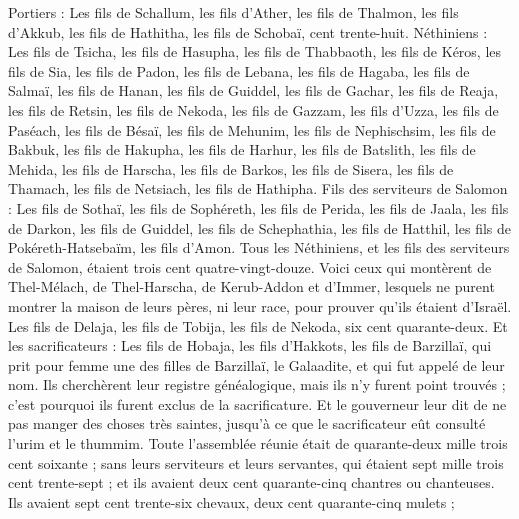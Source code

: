 \begin{multicols}{2}
Portiers : Les fils de Schallum, les fils d'Ather, les fils de Thalmon, les fils d'Akkub, les fils de Hathitha, les fils de Schobaï, cent trente-huit.
Néthiniens : Les fils de Tsicha, les fils de Hasupha, les fils de Thabbaoth,
les fils de Kéros, les fils de Sia, les fils de Padon,
les fils de Lebana, les fils de Hagaba, les fils de Salmaï,
les fils de Hanan, les fils de Guiddel, les fils de Gachar,
les fils de Reaja, les fils de Retsin, les fils de Nekoda,
les fils de Gazzam, les fils d’Uzza, les fils de Paséach,
les fils de Bésaï, les fils de Mehunim, les fils de Nephischsim,
les fils de Bakbuk, les fils de Hakupha, les fils de Harhur,
les fils de Batslith, les fils de Mehida, les fils de Harscha,
les fils de Barkos, les fils de Sisera, les fils de Thamach,
les fils de Netsiach, les fils de Hathipha.
Fils des serviteurs de Salomon : Les fils de Sothaï, les fils de Sophéreth, les fils de Perida,
les fils de Jaala, les fils de Darkon, les fils de Guiddel,
les fils de Schephathia, les fils de Hatthil, les fils de Pokéreth-Hatsebaïm, les fils d'Amon.
Tous les Néthiniens, et les fils des serviteurs de Salomon, étaient trois cent quatre-vingt-douze.
Voici ceux qui montèrent de Thel-Mélach, de Thel-Harscha, de Kerub-Addon et d'Immer, lesquels ne purent montrer la maison de leurs pères, ni leur race, pour prouver qu’ils étaient d'Israël.
Les fils de Delaja, les fils de Tobija, les fils de Nekoda, six cent quarante-deux.
Et les sacrificateurs : Les fils de Hobaja, les fils d'Hakkots, les fils de Barzillaï, qui prit pour femme une des filles de Barzillaï, le Galaadite, et qui fut appelé de leur nom.
Ils cherchèrent leur registre généalogique, mais ils n'y furent point trouvés ; c'est pourquoi ils furent exclus de la sacrificature.
Et le gouverneur leur dit de ne pas manger des choses très saintes, jusqu'à ce que le sacrificateur eût consulté l'urim et le thummim.
Toute l'assemblée réunie était de quarante-deux mille trois cent soixante ;
sans leurs serviteurs et leurs servantes, qui étaient sept mille trois cent trente-sept ; et ils avaient deux cent quarante-cinq chantres ou chanteuses.
Ils avaient sept cent trente-six chevaux, deux cent quarante-cinq mulets ;

\end{multicols}
